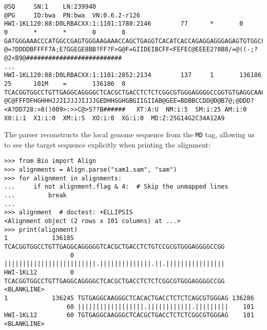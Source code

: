 \begin{verbatim}
@SQ     SN:1    LN:239940
@PG     ID:bwa  PN:bwa  VN:0.6.2-r126
HWI-1KL120:88:D0LRBACXX:1:1101:1780:2146        77      *       0       0       *       *       0       0       GATGGGAAACCCATGGCCGAGTGGGAAGAAACCAGCTGAGGTCACATCACCAGAGGAGGGAGAGTGTGGCCCCTGACTCAGTCCATCAGCTTGTGGAGCTG   @=?DDDDBFFFF7A;E?GGEGE8BB?FF?F>G@F=GIIDEIBCFF<FEFEC@EEEE2?8B8/=@((-;?@2<B9@##########################
...
HWI-1KL120:88:D0LRBACXX:1:1101:2852:2134        137     1       136186  25      101M    =       136186  0       TCACGGTGGCCTGTTGAGGCAGGGGCTCACGCTGACCTCTCTCGGCGTGGGAGGGGCCGGTGTGAGGCAAGGGCTCACGCTGACCTCTCTCGGCGTGGGAG   @C@FFFDFHGHHHJJJIJJJJIJJJGEDHHGGHGBGIIGIIAB@GEE=BDBBCCDD@D@B7@;@DDD?<A?DD728:>8()009>:>>C@>5??B######   XT:A:U  NM:i:5  SM:i:25 AM:i:0  X0:i:1  X1:i:0  XM:i:5  XO:i:0  XG:i:0  MD:Z:25G14G2C34A12A9
\end{verbatim}
The parser reconstructs the local genome sequence from the \verb|MD| tag, allowing us to see the target sequence explicitly when printing the alignment:
\begin{verbatim}
>>> from Bio import Align
>>> alignments = Align.parse("sam1.sam", "sam")
>>> for alignment in alignments:
...     if not alignment.flag & 4:  # Skip the unmapped lines
...         break
...
>>> alignment  # doctest: +ELLIPSIS
<Alignment object (2 rows x 101 columns) at ...>
>>> print(alignment)
1            136185 TCACGGTGGCCTGTTGAGGCAGGGGGTCACGCTGACCTCTGTCCGCGTGGGAGGGGCCGG
                  0 |||||||||||||||||||||||||.||||||||||||||.||.||||||||||||||||
HWI-1KL12         0 TCACGGTGGCCTGTTGAGGCAGGGGCTCACGCTGACCTCTCTCGGCGTGGGAGGGGCCGG
<BLANKLINE>
1            136245 TGTGAGGCAAGGGCTCACACTGACCTCTCTCAGCGTGGGAG 136286
                 60 ||||||||||||||||||.||||||||||||.|||||||||    101
HWI-1KL12        60 TGTGAGGCAAGGGCTCACGCTGACCTCTCTCGGCGTGGGAG    101
<BLANKLINE>
\end{verbatim}

